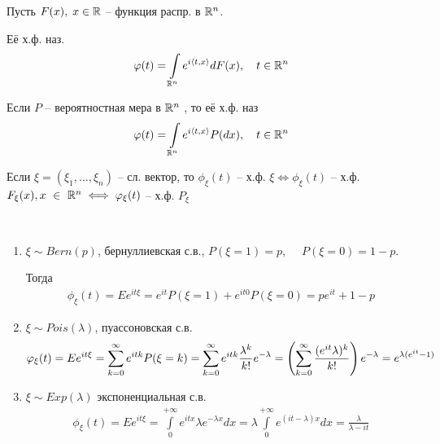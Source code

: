 \begin{definition}
  Пусть $F(x), \; x \in \mathbb{R}$ -- функция распр. в $\mathbb{R}^n$.

  Её х.ф. наз.
  \begin{align*}
    \varphi(t) = \int\limits_{\mathbb{R}^n} e^{i \langle t, x \rangle} dF(x),\quad t \in \mathbb{R}^n
  \end{align*}

  Если $P$ -- вероятностная мера в $\mathbb{R}^n$ , то её х.ф. наз
  \begin{align*}
    \varphi(t) = \int\limits_{\mathbb{R}^n} e^{i \langle t, x \rangle} P(dx),\quad t \in \mathbb{R}^n
  \end{align*}
\end{definition}

\begin{corollary}
  Если $\xi = (\xi_1, \ldots, \xi_n)$ -- сл. вектор, то
  $\phi_\xi(t)$ -- х.ф. $\xi \iff \phi_\xi(t)$ -- х.ф. $F_\xi (x), x~\in~\mathbb{R}^n
  \iff \varphi_\xi (t)$ -- х.ф. $P_\xi$
\end{corollary}

\begin{example}~
  \begin{enumerate}
    \item
      $\xi \sim Bern(p)$, бернуллиевская с.в.,
      $P(\xi = 1) = p,\quad \; P(\xi = 0) = 1 - p$.

      Тогда 
      \begin{align*}
        \phi_\xi (t) = E e^{i t \xi} = e^{i t} P (\xi = 1) + e^{i t 0} P(\xi = 0) 
        = p e^{it} + 1 - p
      \end{align*}

    \item
      $\xi \sim Pois(\lambda)$, пуассоновская с.в.
      \begin{align*}
        \varphi_\xi (t) = E e^{i t \xi} = \sum_{k = 0}^{\infty} e^{i t k} P(\xi = k) 
        = \sum_{k = 0}^{\infty} e^{i t k} \frac{\lambda^k}{k!} e^{-\lambda} 
        = \left( \sum_{k = 0}^{\infty} \frac{(e^{i t} \lambda)^k}{k!} \right) e^{-\lambda}
        = e^{\lambda(e^{it} - 1)}
      \end{align*}

    \item
      $\xi \sim Exp(\lambda)$ экспоненциальная с.в.
      \begin{align*}
        \phi_\xi (t) = E e^{i t \xi} = \int\limits_{0}^{+\infty} e^{i t x} \lambda e^{-\lambda x} dx 
        = \lambda \int\limits_{0}^{+\infty} e^{(it - \lambda) x} dx = \frac{\lambda}{\lambda - i t}
      \end{align*}
  \end{enumerate}
\end{example}

